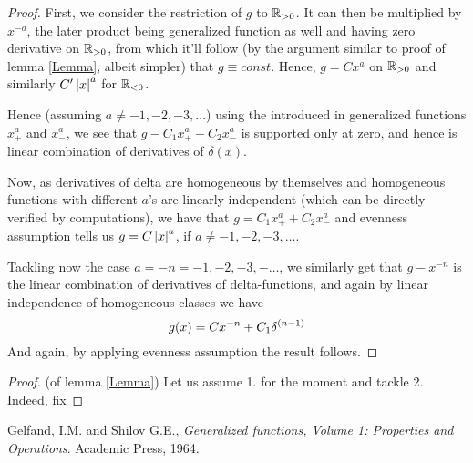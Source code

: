 \documentclass[10pt]{article} %
\begin{document}
\begin{proof}
		First, we consider the restriction of $g$ to $\mathbb{R}_{>0}$. It can then be multiplied by $x^{-a}$, the later
		product being generalized function as well and having zero derivative on $\mathbb{R}_{>0}$, from which it'll follow
		(by the argument similar to proof of lemma \ref{Lemma}, albeit simpler)
		that $g\equiv const$. Hence, $g=Cx^a$ on $\mathbb{R}_{>0}$ and similarly $C'\left|x\right|^a$ for $\mathbb{R}_{<0}$.
		
		Hence (assuming $a\neq-1,-2,-3,\hdots$)
		using the introduced in \cite{gelfand} generalized functions $x^a_+$ and $x_-^a$, we
		see that $g-C_1x_+^a-C_2x_-^a$ is supported only at zero, and hence is linear combination of derivatives
		of $\delta(x)$.

		Now, as derivatives of delta are homogeneous by themselves and homogeneous functions with different $a$'s
		 are linearly independent
		(which can be directly verified by computations), we have that $g=C_1x_+^a+C_2x^a_-$ and evenness assumption
		tells us $g=C\left|x\right|^a$, if $a\neq-1,-2,-3,\hdots$.

		Tackling now the case $a=-n=-1,-2,-3,-\hdots$, we similarly get that $g-x^{-n}$ is the linear combination of
		derivatives of delta-functions, and again by linear independence of homogeneous classes we have
		\[g(x)=Cx^{-n}+C_1\delta^{\left(n-1\right)}\]
		And again, by applying evenness assumption the result follows.
	\end{proof}
	\begin{proof} (of lemma \ref{Lemma}) Let us assume 1. for the moment and tackle 2. Indeed, fix
	\end{proof}
\begin{thebibliography}{9}
Gelfand, I.M. and Shilov G.E., {\em Generalized functions, Volume 1:
 Properties and Operations}. Academic Press, 1964.
\end{thebibliography}
\end{document}
